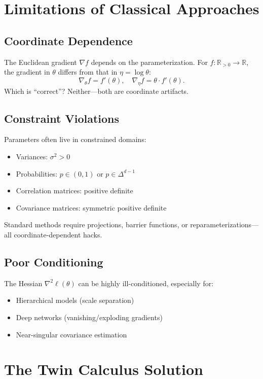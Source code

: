 \documentclass[11pt,twoside]{book}
\theoremstyle{plain}
\theoremstyle{definition}
\theoremstyle{remark}
\newcommand{\R}{\mathbb{R}}
\newcommand{\simplex}{\Delta}
\newcommand{\Rpos}{\R_{>0}}
\begin{document}
\section{Limitations of Classical Approaches}
\label{sec:limitations}

\subsection{Coordinate Dependence}

The Euclidean gradient $\nabla f$ depends on the parameterization. For $f : \Rpos \to \R$, the gradient in $\theta$ differs from that in $\eta = \log \theta$:
\[
\nabla_\theta f = f'(\theta), \quad \nabla_\eta f = \theta \cdot f'(\theta).
\]
Which is ``correct''? Neither—both are coordinate artifacts.

\subsection{Constraint Violations}

Parameters often live in constrained domains:
\begin{itemize}
    \item Variances: $\sigma^2 > 0$
    \item Probabilities: $p \in (0,1)$ or $p \in \simplex^{d-1}$
    \item Correlation matrices: positive definite
    \item Covariance matrices: symmetric positive definite
\end{itemize}

Standard methods require projections, barrier functions, or reparameterizations—all coordinate-dependent hacks.

\subsection{Poor Conditioning}

The Hessian $\nabla^2 \ell(\theta)$ can be highly ill-conditioned, especially for:
\begin{itemize}
    \item Hierarchical models (scale separation)
    \item Deep networks (vanishing/exploding gradients)
    \item Near-singular covariance estimation
\end{itemize}

\section{The Twin Calculus Solution}
\label{sec:twin_solution}
\end{document}
